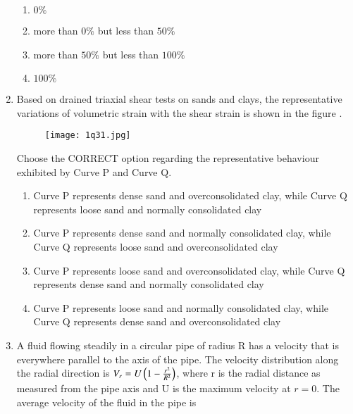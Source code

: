 \documentclass[journal,12pt,onecolumn]{article}
\theoremstyle{remark}
\begin{document}
\begin{enumerate}
\hfill{}
\begin{enumerate}
    \item $0\%$
    \item more than $0\%$ but less than $50\%$
    \item more than $50\%$ but less than $100\%$
    \item $100\%$
\end{enumerate}

\item Based on drained triaxial shear tests on sands and clays, the representative variations of volumetric strain  with the shear strain \brak{\gamma} is shown in the figure .
\begin{figure}[H]
    \centering
    \texttt{[image: 1q31.jpg]}
    \caption{}
    \label{fig:q31}
\end{figure}
Choose the CORRECT option regarding the representative behaviour exhibited by Curve P and Curve Q.

\hfill{}
\begin{enumerate}
    \item Curve P represents dense sand and overconsolidated clay, while Curve Q represents loose sand and normally consolidated clay
    \item Curve P represents dense sand and normally consolidated clay, while Curve Q represents loose sand and overconsolidated clay
    \item Curve P represents loose sand and overconsolidated clay, while Curve Q represents dense sand and normally consolidated clay
    \item Curve P represents loose sand and normally consolidated clay, while Curve Q represents dense sand and overconsolidated clay
\end{enumerate}

\item A fluid flowing steadily in a circular pipe of radius R has a velocity that is everywhere parallel to the axis  of the pipe. The velocity distribution along the radial direction is $V_r = U \left(1-\frac{r^2}{R^2}\right)$, where r is the radial distance as measured from the pipe axis and U is the maximum velocity at $r=0$. The average velocity of the fluid in the pipe is

\hfill{}
\begin{enumerate}
\end{enumerate}


\end{enumerate}
\end{document}
